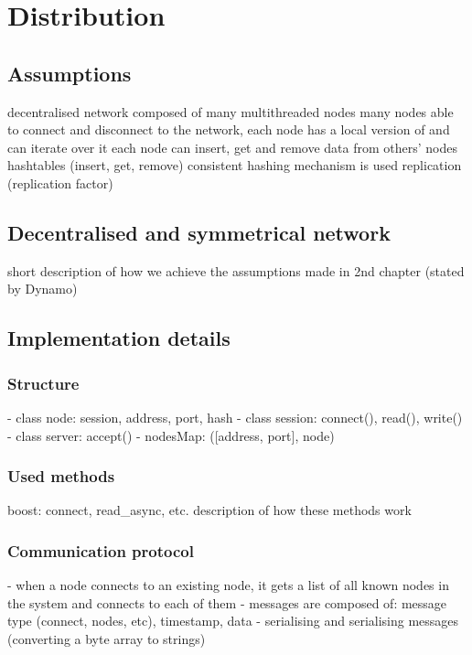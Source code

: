 \chapter{Distribution}

\section{Assumptions}
    decentralised network composed of many multithreaded nodes
    many nodes able to connect and disconnect to the network, 
    each node has a local version of \PHT and can iterate over it
    each node can insert, get and remove data from others' nodes hashtables (insert, get, remove)
    consistent hashing mechanism is used
    replication (replication factor) 
    
\section{Decentralised and symmetrical network}
    short description of how we achieve the assumptions made in 2nd chapter (stated by Dynamo)

\section{Implementation details}
    \subsection{Structure}  %
        - class node: session, address, port, hash
        - class session: connect(), read(), write()
        - class server: accept()
        - nodesMap: ([address, port], node)
        
    \subsection{Used methods}
        boost: connect, read\_async, etc.
        description of how these methods work
        
    \subsection{Communication protocol}
        - when a node connects to an existing node, it gets a list of all known nodes in the system and connects to each of them
        - messages are composed of: message type (connect, nodes, etc), timestamp, data
        - serialising and serialising messages (converting a byte array to strings)
        
